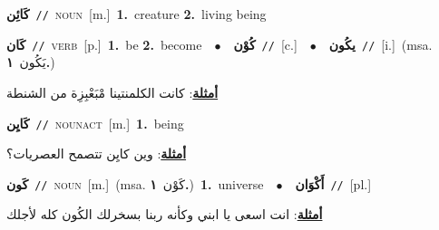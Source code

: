 \documentclass[10pt,a4paper,twoside]{article} %
\begin{document}
\begin{multicols}{2}
{\setlength\topsep{0pt}\textbf{\foreignlanguage{arabic}{كَائِن}}\ {\color{gray}\texttt{//}\color{black}}\ \textsc{noun}\ [m.]\ \textbf{1.}~creature  \textbf{2.}~living being\ } \vspace{2mm}

{\setlength\topsep{0pt}\textbf{\foreignlanguage{arabic}{كَان}}\ {\color{gray}\texttt{//}\color{black}}\ \textsc{verb}\ [p.]\ \textbf{1.}~be  \textbf{2.}~become\ \ $\bullet$\ \ \setlength\topsep{0pt}\textbf{\foreignlanguage{arabic}{كُوْن}}\ {\color{gray}\texttt{//}\color{black}}\ [c.]\ \ $\bullet$\ \ \setlength\topsep{0pt}\textbf{\foreignlanguage{arabic}{يكُون}}\ {\color{gray}\texttt{//}\color{black}}\ [i.]\ \color{gray}(msa. \foreignlanguage{arabic}{يَكُون}~\foreignlanguage{arabic}{\textbf{١.}})\color{black}\  \begin{flushright}\color{gray}\foreignlanguage{arabic}{\textbf{\underline{\foreignlanguage{arabic}{أمثلة}}}: كانت الكلمنتينا مْبَعْبِزِة من الشنطة}\end{flushright}\color{black}} \vspace{2mm}

{\setlength\topsep{0pt}\textbf{\foreignlanguage{arabic}{كَايِن}}\ {\color{gray}\texttt{//}\color{black}}\ \textsc{noun\textunderscore act}\ [m.]\ \textbf{1.}~being\  \begin{flushright}\color{gray}\foreignlanguage{arabic}{\textbf{\underline{\foreignlanguage{arabic}{أمثلة}}}: وين كايِن تتصمح العصريات؟}\end{flushright}\color{black}} \vspace{2mm}

{\setlength\topsep{0pt}\textbf{\foreignlanguage{arabic}{كَون}}\ {\color{gray}\texttt{//}\color{black}}\ \textsc{noun}\ [m.]\ \color{gray}(msa. \foreignlanguage{arabic}{كَوْن}~\foreignlanguage{arabic}{\textbf{١.}})\color{black}\ \textbf{1.}~universe\ \ $\bullet$\ \ \setlength\topsep{0pt}\textbf{\foreignlanguage{arabic}{أَكْوَان}}\ {\color{gray}\texttt{//}\color{black}}\ [pl.]\  \begin{flushright}\color{gray}\foreignlanguage{arabic}{\textbf{\underline{\foreignlanguage{arabic}{أمثلة}}}: انت اسعى يا ابني وكأنه ربنا بسخرلك الكُون كله لأجلك}\end{flushright}\color{black}} \vspace{2mm}


\end{multicols}
\end{document}
